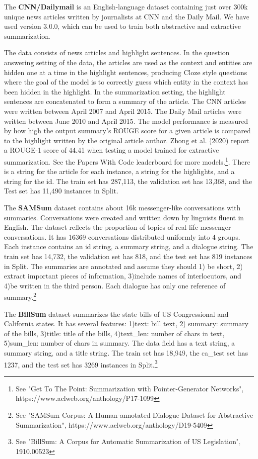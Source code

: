 \documentclass[twoside,twocolumn]{article}
\begin{document}
The \textbf{CNN/Dailymail} is an English-language dataset containing just over 300k unique news articles written by journalists at CNN and 
the Daily Mail. We have used version 3.0.0, which can be used to train both abstractive and extractive summarization.\par
The data consists of news articles and highlight sentences. In the question answering setting of the data, the articles are used as the 
context and entities are hidden one at a time in the highlight sentences, producing Cloze style questions where the goal of the model is 
to correctly guess which entity in the context has been hidden in the highlight. In the summarization setting, the highlight sentences are 
concatenated to form a summary of the article. The CNN articles were written between April 2007 and April 2015. The Daily Mail articles were 
written between June 2010 and April 2015.
The model performance is measured by how high the output summary's ROUGE score for a given article is compared to the highlight written by 
the original article author. Zhong et al. (2020) report a ROUGE-1 score of 44.41 when testing a model trained for extractive summarization. 
See the Papers With Code leaderboard for more models.\footnote{See "Get To The Point: Summarization with Pointer-Generator Networks", 
https://www.aclweb.org/anthology/P17-1099}. There is a string for the article for each instance, a string for the highlights, and a 
string for the id.  The train set has 287,113, the validation set has 13,368, and the Test set has 11,490 instances in Split.

The \textbf{SAMSum} dataset contains about 16k messenger-like conversations with summaries. Conversations were created and written down 
by linguists fluent in English. The dataset reflects the proportion of topics of real-life messenger conversations.  It has 16369 
conversations distributed uniformly into 4 groups. Each instance contains an id string, a summary string, and a dialogue string.  
The train set has 14,732, the validation set has 818, and the test set has 819 instances in Split.  The summaries are annotated and 
assume they should 1) be short, 2) extract important pieces of information, 3)include names of interlocutors, and 4)be written in 
the third person. Each dialogue has only one reference of summary.\footnote{See "{SAMS}um Corpus: A Human-annotated Dialogue Dataset 
for Abstractive Summarization", https://www.aclweb.org/anthology/D19-5409} \par

The \textbf{BillSum} dataset summarizes the state bills of US Congressional and California states. It has several features: 1)text: 
bill text, 2) summary: summary of the bills, 3)title: title of the bills, 4)text\_len: number of chars in text, 5)sum\_len: number 
of chars in summary. The data field has a text string, a \cite{aksenov2020abstractive} summary string, and a title string. The train 
set has 18,949,  the ca\_test set has 1237, and the test set has 3269 instances in Split.\footnote{See "BillSum: A Corpus for Automatic 
Summarization of US Legislation", 1910.00523}
\end{document}
